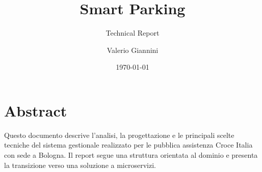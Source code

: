 \documentclass[11pt,a4paper]{scrreprt}
\title{Smart Parking}
\subtitle{Technical Report}
\author{Valerio Giannini \\ \emailaddr{valerio.giannini@studio.unibo.it}}
\date{\today}
\begin{document}
\maketitle

\chapter{Abstract}
Questo documento descrive l'analisi, la progettazione e le principali scelte tecniche del sistema gestionale realizzato per le pubblica assistenza Croce Italia con sede a Bologna.
Il report segue una struttura orientata al dominio e presenta la transizione verso una soluzione a microservizi.


\tableofcontents
\clearpage









\end{document}
